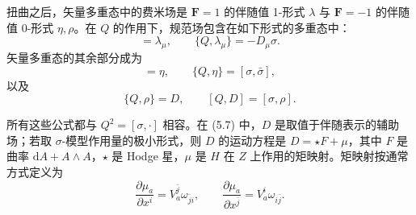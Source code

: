 \documentclass[11pt,a4paper,UTF8]{ctexart}
\theoremstyle{plain}
\theoremstyle{definition}
\begin{document}

扭曲之后，矢量多重态中的费米场是 $\mathbf F=1$ 的伴随值 1-形式 $\lambda$ 与 $\mathbf F=-1$ 的伴随值 0-形式 $\eta,\rho$。在 $Q$ 的作用下，规范场包含在如下形式的多重态中：
\begin{equation}
    [Q,A_\mu]=\lambda_\mu,\qquad \{Q,\lambda_\mu\}=-D_\mu\sigma.
    \tag{5.5}
\end{equation}
矢量多重态的其余部分成为
\begin{equation}
    [Q,\bar\sigma]=\eta,\qquad \{Q,\eta\}=[\sigma,\bar\sigma],
    \tag{5.6}
\end{equation}
以及
\begin{equation}
    \{Q,\rho\}=D,\qquad [Q,D]=[\sigma,\rho].
    \tag{5.7}
\end{equation}


所有这些公式都与 $Q^2=[\sigma,\cdot]$ 相容。在 (5.7) 中，$D$ 是取值于伴随表示的辅助场；若取 $\sigma$-模型作用量的极小形式，则 $D$ 的运动方程是 $D=\star F+\mu$，其中 $F$ 是曲率 $\mathrm dA+A\wedge A$，$\star$ 是 Hodge 星，$\mu$ 是 $H$ 在 $Z$ 上作用的矩映射。矩映射按通常方式定义为
\begin{equation}
    \frac{\partial\mu_a}{\partial x^i}=V_a^{\bar j}\omega_{\bar j i},\qquad
    \frac{\partial\mu_a}{\partial x^{\bar j}}=V_a^i\omega_{i\bar j}.
    \tag{5.8}
\end{equation}

\end{document}
